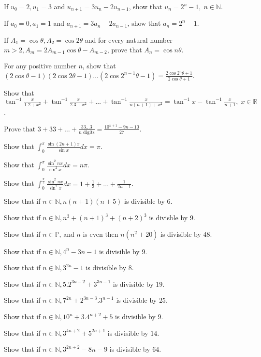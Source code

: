 \item If $u_0 = 2, u_1 = 3$ and $u_{n + 1} = 3u_n - 2u_{n - 1}$, show that $u_n = 2^n - 1,\;n\in \mathbb{N}$.
\item If $a_0 = 0, a_1 = 1$ and $a_{n + 1} = 3a_n - 2a_{n - 1}$, show that $a_n = 2^n - 1$.
\item If $A_1 = \cos\theta, A_2 = \cos2\theta$ and for every natural number $m > 2, A_m = 2A_{m-1}\cos\theta - A_{m - 2}$, prove
  that $A_n = \cos n\theta$.
\item For any positive number $n$, show that $(2\cos\theta - 1)(2\cos2\theta - 1)\ldots(2\cos2^{n - 1}\theta - 1) =
  \frac{2\cos2^n\theta + 1}{2\cos\theta + 1}$.
\item Show that $\tan^{-1}\frac{x}{1.2 + x^2} + \tan^{-1}\frac{x}{2.3 + x^2} + \ldots + \tan^{-1}\frac{x}{n(n + 1) + x^2} =
  \tan^{-1}x - \tan^{-1}\frac{x}{n + 1},\;x\in \mathbb{R}$.
\item Prove that $3 + 33 + \ldots + \frac{33\ldots3}{n\text{~digits}} = \frac{10^{n + 1} - 9n - 10}{27}$.
\item Show that $\displaystyle\int_{0}^\pi\frac{\sin(2n + 1)x}{\sin x}dx = \pi$.
\item Show that $\displaystyle\int_{0}^\pi\frac{\sin^2nx}{\sin^2x}dx = n\pi$.
\item Show that $\displaystyle\int_{0}^{\frac{\pi}{2}}\frac{\sin^2nx}{\sin^2x}dx = 1 + \frac{1}{3} + \ldots + \frac{1}{2n - 1}$.
\item Show that if $n\in\mathbb{N}, n(n + 1)(n + 5)$ is divisible by $6$.
\item Show that if $n\in\mathbb{N}, n^3 + (n + 1)^3 + (n + 2)^3$ is divisble by $9$.
\item Show that if $n\in\mathbb{P}$, and $n$ is even then $n(n^2 + 20)$ is divisible by $48$.
\item Show that if $n\in\mathbb{N}, 4^n - 3n - 1$ is divisible by $9$.
\item Show that if $n\in\mathbb{N}, 3^{2n} - 1$ is divisible by $8$.
\item Show that if $n\in\mathbb{N}, 5.2^{3n - 2} + 3^{3n - 1}$ is divisible by $19$.
\item Show that if $n\in\mathbb{N}, 7^{2n} + 2^{3n - 3}.3^{n - 1}$ is divisible by $25$.
\item Show that if $n\in\mathbb{N}, 10^n + 3.4^{n + 2} + 5$ is divisible by $9$.
\item Show that if $n\in\mathbb{N}, 3^{4n + 2} + 5^{2n + 1}$ is divisible by $14$.
\item Show that if $n\in\mathbb{N}, 3^{2n + 2} - 8n - 9$ is divisible by $64$.
